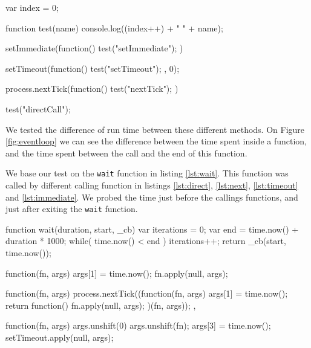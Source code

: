 \documentclass{article}
\begin{document}
\begin{code}[Javascript, caption={test order of execution},label={lst:order}]
var index = 0;

function test(name) {
  console.log((index++) + " " + name);
}

setImmediate(function() {
  test("setImmediate");
})

setTimeout(function() {
  test("setTimeout");
}, 0);

process.nextTick(function() {
  test("nextTick");
})

test("directCall");
\end{code}


We tested the difference of run time between these different methods.
On Figure \ref{fig:eventloop} we can see the difference between the time spent inside a function, and the time spent between the call and the end of this function.

We base our test on the \texttt{wait} function in listing \ref{lst:wait}.
This function was called by different calling function in listings \ref{lst:direct}, \ref{lst:next}, \ref{lst:timeout} and \ref{lst:immediate}.
We probed the time just before the callings functions, and just after exiting the \texttt{wait} function.

\begin{code}[Javascript, caption={wait function},label={lst:wait}]
function wait(duration, start, _cb) {
  var iterations = 0;
  var end = time.now() + duration * 1000;
  while( time.now() < end ) {
    iterations++;
  }
  return _cb(start, time.now());
}
\end{code}


\begin{code}[Javascript, caption={Direct call},label={lst:direct}]
function(fn, args) {
  args[1] = time.now();
  fn.apply(null, args);
}
\end{code}

\begin{code}[Javascript, caption={\textit{nextTick}},label={lst:next}]
function(fn, args) {
  process.nextTick((function(fn, args) {
    args[1] = time.now();
    return function() {
      fn.apply(null, args);
    }
  })(fn, args));
},
\end{code}

\begin{code}[Javascript, caption={\textit{setTimeout}},label={lst:timeout}]
function(fn, args) {
  args.unshift(0)
  args.unshift(fn);
  args[3] = time.now();
  setTimeout.apply(null, args);
}
\end{code}
\end{document}
